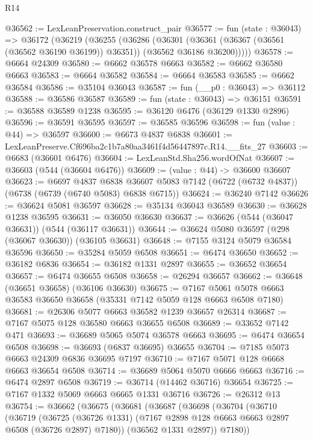 \begin{lexlean}{R14}
\begin{coremodule}
@36562 := LexLeanPreservation.construct_pair
@36577 := fun (state : @36043) =>
  @36172
    (@36219
      (@36255
        (@36286
          (@36301
            (@36361 (@36367 (@36561 (@36562 @36190 @36199)) @36351))
            (@36562 @36186 @36200)))))
@36578 := @6664 @24309
@36580 := @6662 @36578 @6663
@36582 := @6662 @36580 @6663
@36583 := @6664 @36582
@36584 := @6664 @36583
@36585 := @6662 @36584
@36586 := @35104 @36043
@36587 := fun (__p0 : @36043) => @36112
@36588 := @36586 @36587
@36589 := fun (state : @36043) => @36151
@36591 := @36588 @36589 @1238
@36595 := @36120 @6476 (@36129 @1330 @2896)
@36596 := @36591 @36595
@36597 := @36585 @36596
@36598 := fun (value : @44) => @36597
@36600 := @6673 @4837 @6838
@36601 := LexLeanPreserve.Cf696ba2c1b7a80aa3461f4d56447897c.R14.__fits_27
@36603 := @6683 (@36601 @6476)
@36604 := LexLeanStd.Sha256.wordOfNat
@36607 := @36603 (@544 (@36604 @6476))
@36609 := (value : @44) -> @36600 @36607
@36623 := @6697
    @4837
    @6838
    @36607
    @5083
    @7142
    (@6722 (@6732 @4837))
    (@6738 (@6739 (@6740 @5083) @6838 @6715))
@36624 := @36240 @7142
@36626 := @36624 @5081 @36597
@36628 := @35134 @36043 @36589
@36630 := @36628 @1238 @36595
@36631 := @36050 @36630
@36637 := @36626 (@544 (@36047 @36631)) (@544 (@36117 @36631))
@36644 := @36624 @5080 @36597 (@298 (@36067 @36630)) (@36105 @36631)
@36648 := @7155 @3124 @5079 @36584 @36596
@36650 := @35284 @5059 @6508
@36651 := @6474 @36650
@36652 := @36182 @6836
@36654 := @36182 @1331 @2897
@36655 := @36652 @36654
@36657 := @6474 @36655 @6508
@36658 := @26294 @36657
@36662 := @36648 (@36651 @36658) (@36106 @36630)
@36675 := @7167 @5061 @5078 @6663 @36583 @36650 @36658 (@35331 @7142 @5059 @128 @6663 @6508 @7180)
@36681 := @26306 @5077 @6663 @36582 @1239 @36657 @26314
@36687 := @7167 @5075 @128 @36580 @6663 @36655 @6508
@36689 := @33652 @7142 @471
@36693 := @36689 @5065 @5074 @36578 @6663
@36695 := @6474 @36654 @6508
@36698 := @36693 (@6837 @36695) @36655
@36704 := @7185 @5073 @6663 @24309 @6836 @36695 @7197
@36710 := @7167 @5071 @128 @6668 @6663 @36654 @6508
@36714 := @36689 @5064 @5070 @6666 @6663
@36716 := @6474 @2897 @6508
@36719 := @36714 (@14462 @36716) @36654
@36725 := @7167 @1332 @5069 @6663 @6665 @1331 @36716
@36726 := @26312 @13
@36754 := @36662
    (@36675
      (@36681
        (@36687
          (@36698
            (@36704
              (@36710
                (@36719
                  (@36725
                    (@36726 @1331)
                    (@7167 @2898 @128 @6663 @6663 @2897 @6508 (@36726 @2897) @7180))
                  (@36562 @1331 @2897))
                @7180))

\end{coremodule}
\end{lexlean}
